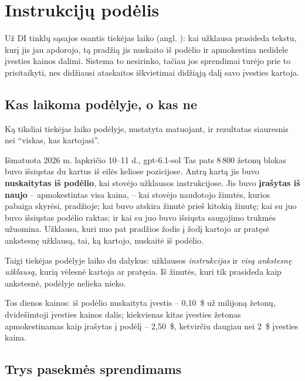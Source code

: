 \section{Instrukcijų podėlis}\label{sec:models:cache}

Už DI tinklų sąsajos esantis tiekėjas laiko  (angl. ): kai užklausa prasideda tekstu, kurį jis jau apdorojo, tą pradžią jis nuskaito iš
podėlio ir apmokestina nedidele įvesties kainos dalimi. Sistema to nesirinko, tačiau jos
sprendimai turėjo prie to prisitaikyti, nes didžiausi ataskaitos iškvietimai didžiąją dalį
savo įvesties kartoja.

\subsection{Kas laikoma podėlyje, o kas ne}

Ką tiksliai tiekėjas laiko podėlyje, nustatyta matuojant, ir rezultatas siauresnis nei
\enquote{viskas, kas kartojasi}.

\begin{lessonbox}{Išmatuota 2026 m. lapkričio 10--11 d., gpt-6.1-sol}
Tas pats 8\,800 žetonų blokas buvo išsiųstas du kartus iš eilės keliose pozicijose. Antrą
kartą jis buvo \textbf{nuskaitytas iš podėlio}, kai stovėjo užklausos instrukcijose. Jis buvo
\textbf{įrašytas iš naujo} -- apmokestintas visa kaina, -- kai stovėjo naudotojo žinutės,
kurios pabaiga skyrėsi, pradžioje; kai buvo atskira žinutė prieš kitokią žinutę; kai su juo
buvo išsiųstas podėlio raktas; ir kai su juo buvo išsiųsta saugojimo trukmės užuomina.
Užklausa, kuri nuo pat pradžios žodis į žodį kartojo ar pratęsė ankstesnę užklausą, tai, ką
kartojo, nuskaitė iš podėlio.

Taigi tiekėjas podėlyje laiko du dalykus: užklausos \emph{instrukcijas} ir \emph{visą
ankstesnę užklausą}, kurią vėlesnė kartoja ar pratęsia. Iš žinutės, kuri tik prasideda kaip
ankstesnė, podėlyje nelieka nieko.

Tos dienos  kainos: iš podėlio nuskaityta įvestis -- 0,10~\$ už milijoną
žetonų, dvidešimtoji įvesties kainos dalis; kiekvienas kitas įvesties žetonas apmokestinamas
kaip įrašytas į podėlį -- 2,50~\$, ketvirčiu daugiau nei 2~\$ įvesties kaina.
\end{lessonbox}

\subsection{Trys pasekmės sprendimams}

